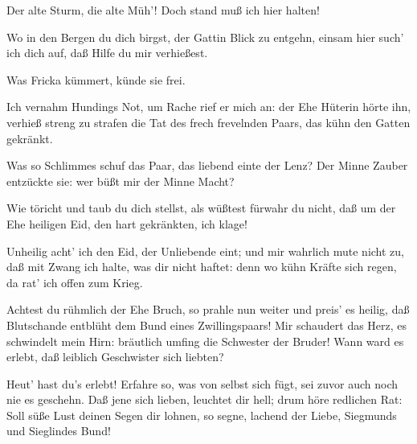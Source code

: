 \begin{drama}

\Wotanspeaks


Der alte Sturm, die alte Müh'!
Doch stand muß ich hier halten!
 

\Frickaspeaks


Wo in den Bergen du dich birgst,
der Gattin Blick zu entgehn,
einsam hier such' ich dich auf,
daß Hilfe du mir verhießest.
 

\Wotanspeaks
Was Fricka kümmert, künde sie frei.
 

\Frickaspeaks
Ich vernahm Hundings Not,
um Rache rief er mich an:
der Ehe Hüterin hörte ihn,
verhieß streng zu strafen die Tat
des frech frevelnden Paars,
das kühn den Gatten gekränkt.
 

\Wotanspeaks
Was so Schlimmes schuf das Paar,
das liebend einte der Lenz?
Der Minne Zauber entzückte sie:
wer büßt mir der Minne Macht?
 

\Frickaspeaks
Wie töricht und taub du dich stellst,
als wüßtest fürwahr du nicht,
daß um der Ehe heiligen Eid,
den hart gekränkten, ich klage!
 

\Wotanspeaks
Unheilig acht' ich den Eid,
der Unliebende eint;
und mir wahrlich mute nicht zu,
daß mit Zwang ich halte, was dir nicht haftet:
denn wo kühn Kräfte sich regen,
da rat' ich offen zum Krieg.
 

\Frickaspeaks
Achtest du rühmlich der Ehe Bruch,
so prahle nun weiter und preis' es heilig,
daß Blutschande entblüht
dem Bund eines Zwillingspaars!
Mir schaudert das Herz, es schwindelt mein Hirn:
bräutlich umfing die Schwester der Bruder!
Wann ward es erlebt,
daß leiblich Geschwister sich liebten?
 

\Wotanspeaks
Heut' hast du's erlebt!
Erfahre so, was von selbst sich fügt,
sei zuvor auch noch nie es geschehn.
Daß jene sich lieben, leuchtet dir hell;
drum höre redlichen Rat:
Soll süße Lust deinen Segen dir lohnen,
so segne, lachend der Liebe,
Siegmunds und Sieglindes Bund!
 

\Frickaspeaks


\end{drama}

